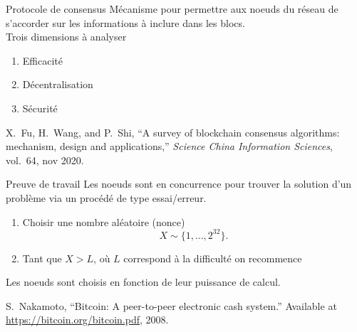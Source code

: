 \documentclass{beamer}
\begin{document}
\begin{frame}{Protocole de consensus}
Mécanisme pour permettre aux noeuds du réseau de s'accorder sur les informations à inclure dans les blocs.\\
\vspace{0.3cm}
Trois dimensions à analyser
\begin{enumerate}
  \item Efficacité 
  \item Décentralisation
  \item Sécurité 
  
\end{enumerate}
\footnotesize
\begin{thebibliography}{1}
X.~Fu, H.~Wang, and P.~Shi, ``A survey of blockchain consensus algorithms:
  mechanism, design and applications,'' {\em Science China Information
  Sciences}, vol.~64, nov 2020.
\end{thebibliography}

\end{frame}
\begin{frame}{Preuve de travail}
Les noeuds sont en concurrence pour trouver la solution d'un problème via un procédé de type essai/erreur.
\begin{tcolorbox}[enhanced,drop shadow, title=PoW]
\begin{enumerate}
    \item Choisir une nombre aléatoire (nonce)
    \[
    X\sim\{1,\ldots, 2^{32}\}.
    \]
    \item Tant que $X > L$, où $L$ correspond à la difficulté on recommence  
\end{enumerate}
\end{tcolorbox}
\vspace{0.3cm}
Les noeuds sont choisis en fonction de leur puissance de calcul.
{\footnotesize
\begin{thebibliography}{1}
S.~Nakamoto, ``Bitcoin: A peer-to-peer electronic cash system.'' Available at
  \href{https://bitcoin.org/bitcoin.pdf}{https://bitcoin.org/bitcoin.pdf},
  2008.
\end{thebibliography}  
}
\end{frame}
\end{document}
